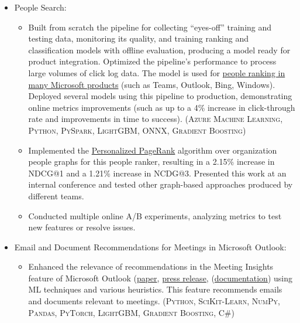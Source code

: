 \documentclass{article}
\begin{document}
\begin{itemize}

\item People Search:

  \begin{itemize}

  \item Built from scratch the pipeline for collecting ``eyes-off'' training and testing data, monitoring its quality, and training ranking and classification models with offline evaluation, producing a model ready for product integration. Optimized the pipeline's performance to process large volumes of click log data. The model is used for \href{https://www.youtube.com/watch?v=a6HO4ekmmjU}{people ranking in many Microsoft products} (such as Teams, Outlook, Bing, Windows). Deployed several models using this pipeline to production, demonstrating online metrics improvements (such as up to a 4\% increase in click-through rate and improvements in time to success). (\textsc{Azure Machine Learning}, \textsc{Python}, \textsc{PySpark}, \textsc{LightGBM}, \textsc{ONNX}, \textsc{Gradient Boosting})

  \item Implemented the \href{https://www.cs.cornell.edu/~bindel/blurbs/edgeppr.html}{Personalized PageRank} algorithm over organization people graphs for this people ranker, resulting in a 2.15\% increase in NDCG@1 and a 1.21\% increase in NCDG@3. Presented this work at an internal conference and tested other graph-based approaches produced by different teams.

  \item Conducted multiple online A/B experiments, analyzing metrics to test new features or resolve issues.

  \end{itemize}

\item Email and Document Recommendations for Meetings in Microsoft Outlook:

  \begin{itemize}

  \item Enhanced the relevance of recommendations in the Meeting Insights feature of Microsoft Outlook (\href{https://www.microsoft.com/en-us/research/publication/calendar-aware-proactive-email-recommendation/}{paper}, \href{https://www.microsoft.com/en-us/research/blog/the-story-of-an-office-ai-feature-how-ai-can-promote-efficient-meeting-preparation/}{press release}, (\href{https://support.microsoft.com/en-gb/office/use-intelligent-technology-in-outlook-on-the-web-and-outlook-com-24b30683-8340-4b69-b8ac-4193ec528a70}{documentation}) using ML techniques and various heuristics. This feature recommends emails and documents relevant to meetings. (\textsc{Python}, \textsc{SciKit-Learn}, \textsc{NumPy}, \textsc{Pandas}, \textsc{PyTorch}, \textsc{LightGBM}, \textsc{Gradient Boosting}, \textsc{C\#})


\end{itemize}
\end{itemize}
\end{document}
